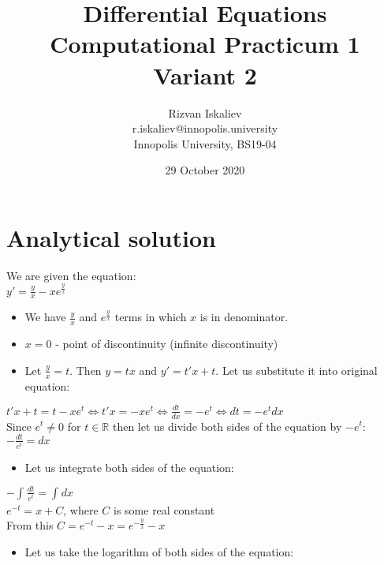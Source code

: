 \documentclass[12pt, a4paper]{article}
\title{Differential Equations \\ Computational Practicum 1 \\ Variant 2}
\author{Rizvan Iskaliev \\ r.iskaliev@innopolis.university \\ Innopolis University, BS19-04}
\date{29 October 2020}
\begin{document}
\maketitle

\section{Analytical solution}
    \begin{center}
         We are given the equation: \\
         $y' = \frac{y}{x} - xe^{\frac{y}{x}}$
    \end{center}
    
    \begin{itemize} 
        \item We have $\frac{y}{x}$ and $e^{\frac{y}{x}}$ terms in which $x$ is in denominator.
        \item $x = 0$ - point of discontinuity (infinite discontinuity)
        \item Let $\frac{y}{x} = t$. Then $y = tx$ and $y' = t'x + t$. Let us substitute it into original equation:
    \end{itemize}
    
    \begin{center}
         $t'x + t = t - xe^{t} \Leftrightarrow t'x = -xe^{t} \Leftrightarrow \frac{dt}{dx} = -e^{t} \Leftrightarrow dt = -e^{t}dx$ \\
         Since $e^{t} \neq 0$ for $t \in \mathbb{R}$ then let us divide both sides of the equation by $-e^{t}$: \\
         $-\frac{dt}{e^{t}} = dx$ \\
    \end{center}
    
    \begin{itemize}
        \item Let us integrate both sides of the equation:
    \end{itemize}
    \begin{center}
        $-\int_{}^{}\frac{dt}{e^{t}} = \int_{}^{}dx$ \\
        $e^{-t} = x + C$, where $C$ is some real constant \\
        From this $C = e^{-t} - x = e^{-\frac{y}{x}} - x$ \\
    \end{center}
    
    \begin{itemize}
        \item Let us take the logarithm of both sides of the equation:
    \end{itemize}
    
\end{document}
